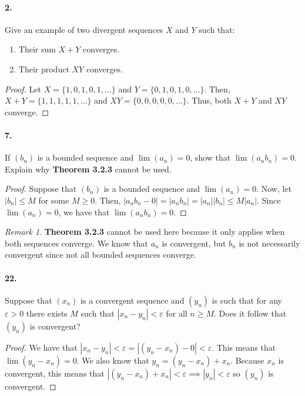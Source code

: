 \documentclass[12pt]{article}
\theoremstyle{remark}
\newtheorem*{remark}{Remark}
\begin{document}
\paragraph{2.} Give an example of two divergent sequences $X$ and $Y$ such that:
\begin{enumerate}[label=(\alph*)]
    \item Their sum $X + Y$ converges.
    \item Their product $XY$ converges. 
\end{enumerate}
\begin{proof}
    Let $X = \{ 1, 0, 1, 0, 1, \ldots \}$ and $Y = \{ 0, 1, 0, 1, 0, \ldots \}$. Then, $X + Y = \{ 1, 1, 1, 1, 1, \ldots \}$ and $XY = \{ 0, 0, 0, 0, 0, \ldots \}$. Thus, both $X + Y$ and $XY$ converge.
\end{proof}

\paragraph{7.} If $(b_n)$ is a bounded sequence and $\lim(a_n) = 0$, show that $\lim(a_n b_n) = 0$. Explain why \textbf{Theorem 3.2.3} cannot be used. 
\begin{proof}
    Suppose that $(b_n)$ is a bounded sequence and $\lim(a_n) = 0$. Now, let $|b_n| \leq M$ for some $M \geq 0$. Then, $|a_n b_n - 0| = |a_n b_n| = |a_n| |b_n| \leq M |a_n|$. Since $\lim(a_n) = 0$, we have that $\lim(a_n b_n) = 0$.
\end{proof}
\begin{remark}
    \textbf{Theorem 3.2.3} cannot be used here because it only applies when both sequences converge. We know that $a_n$ is convergent, but $b_n$ is not necessarily convergent since not all bounded sequences converge.
\end{remark}

\paragraph{22.} Suppose that $(x_n)$ is a convergent sequence and $(y_n)$ is such that for any $\varepsilon > 0$ there exists $M$ such that $|x_n - y_n| < \varepsilon$ for all $n \geq M$. Does it follow that $(y_n)$ is convergent?
\begin{proof}
    We have that $|x_n - y_n| < \varepsilon = |(y_n - x_n) - 0| < \varepsilon$. This means that $\lim(y_n - x_n) = 0$. We also know that $y_n = (y_n - x_n) + x_n$. Because $x_n$ is convergent, this means that $|(y_n - x_n) + x_n| < \varepsilon \implies |y_n| < \varepsilon$ so $(y_n)$ is convergent.
\end{proof}
\end{document}
